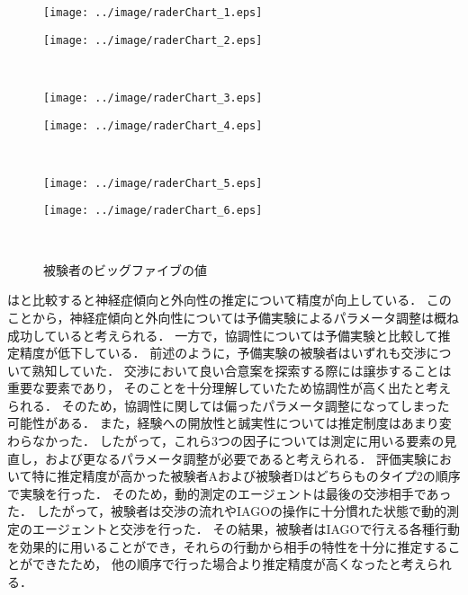 \begin{figure}[!bt]
    \begin{minipage}[b]{0.47\linewidth}
        \centering
        \texttt{[image: ../image/raderChart\_1.eps]}
        \label{fig:big5_sub1}
    \end{minipage}
    \begin{minipage}[b]{0.47\linewidth}
        \centering
        \texttt{[image: ../image/raderChart\_2.eps]}
        \label{fig:big5_sub2}
    \end{minipage}\\
    \begin{minipage}[b]{0.47\linewidth}
        \centering
        \texttt{[image: ../image/raderChart\_3.eps]}
        \label{fig:big5_sub3}
    \end{minipage}
    \begin{minipage}[b]{0.47\linewidth}
        \centering
        \texttt{[image: ../image/raderChart\_4.eps]}
        \label{fig:big5_sub4}
    \end{minipage}\\
    \begin{minipage}[b]{0.47\linewidth}
        \centering
        \texttt{[image: ../image/raderChart\_5.eps]}
        \label{fig:big5_sub5}
    \end{minipage}
    \begin{minipage}[b]{0.47\linewidth}
        \centering
        \texttt{[image: ../image/raderChart\_6.eps]}
        \label{fig:big5_sub6}
    \end{minipage}\\
    \caption{被験者のビッグファイブの値}\label{fig:big5}
\end{figure}

はと比較すると神経症傾向と外向性の推定について精度が向上している．
このことから，神経症傾向と外向性については予備実験によるパラメータ調整は概ね成功していると考えられる．
一方で，協調性については予備実験と比較して推定精度が低下している．
前述のように，予備実験の被験者はいずれも交渉について熟知していた．
交渉において良い合意案を探索する際には譲歩することは重要な要素であり，
そのことを十分理解していたため協調性が高く出たと考えられる．
そのため，協調性に関しては偏ったパラメータ調整になってしまった可能性がある．
また，経験への開放性と誠実性については推定制度はあまり変わらなかった．
したがって，これら3つの因子については測定に用いる要素の見直し，および更なるパラメータ調整が必要であると考えられる．
評価実験において特に推定精度が高かった被験者Aおよび被験者Dはどちらものタイプ2の順序で実験を行った．
そのため，動的測定のエージェントは最後の交渉相手であった．
したがって，被験者は交渉の流れやIAGOの操作に十分慣れた状態で動的測定のエージェントと交渉を行った．
その結果，被験者はIAGOで行える各種行動を効果的に用いることができ，それらの行動から相手の特性を十分に推定することができたため，
他の順序で行った場合より推定精度が高くなったと考えられる．

